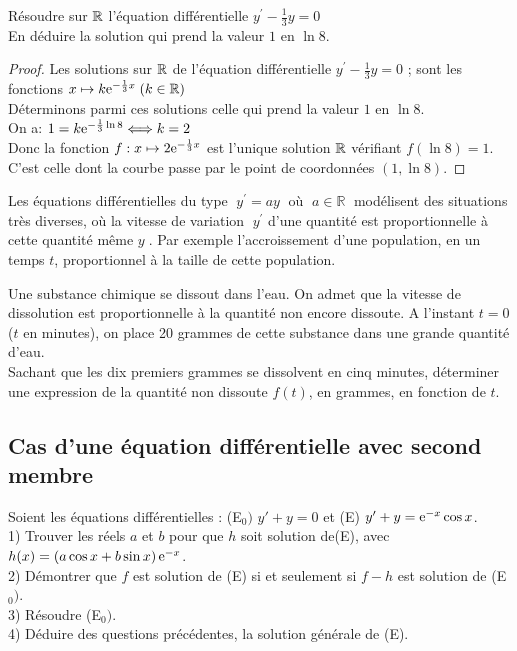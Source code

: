 \begin{exercice}
Résoudre sur $ \mathbb{R} $ l'équation  différentielle \; $ y^{\prime}-\frac{1}{3}y=0 $\\ 
En déduire la solution qui prend la valeur $1 $ en $ \ln 8$.

\end{exercice}
\begin{proof}
Les solutions sur $ \mathbb{R} $ de l'équation  différentielle \; $ y^{\prime}-\frac{1}{3}y=0 $\; ; \; sont les fonctions  $ x\mapsto k\mathrm{e}^{-\frac{1}{3}x}\; (k\in\mathbb{R}) $\\
Déterminons parmi ces solutions celle qui prend la valeur $1 $ en $ \ln 8$.\\ On a:\; $ 1=k\mathrm{e}^{-\frac{1}{3}\ln 8} \Longleftrightarrow k=2$\\
Donc la fonction \;$f:  x\mapsto 2\mathrm{e}^{-\frac{1}{3}x} $  est l'unique solution $ \mathbb{R} $  vérifiant \;$ f(\ln 8)=1 $. C'est celle  dont la courbe passe par le point de coordonnées \;$ (1, \ln 8) $.
\end{proof}
\begin{remark}
Les équations différentielles du type $\;  y^{\prime}=ay \; $ où  $\;  a\in\mathbb{R}\;  $  modélisent des situations très diverses, où la vitesse  de variation $\;   y^{\prime} $ d'une quantité est proportionnelle à cette quantité même $ y \; $. Par exemple l'accroissement d'une population, en un temps $ t $, proportionnel à  la taille de cette population.
\end{remark}
\begin{exercice}
Une substance chimique se dissout dans l'eau. On admet que la vitesse de dissolution est
proportionnelle à la quantité non encore dissoute. A l'instant $t=0$ ($t$ en minutes), on place 20 grammes
de cette substance dans une grande quantité d'eau.\\
Sachant que les dix premiers grammes se dissolvent en cinq minutes, déterminer une expression de la
quantité non dissoute $f(t)$, en grammes, en fonction de $t$.
\end{exercice}
\subsection*{Cas d'une équation différentielle avec second membre}
\begin{exercice}
  Soient les équations différentielles :\; (E$_{0})$ \;$  y'+y=0 $\; et \; (E) \;$  y'+y=\mathrm{e}^{-x}\cos x $.\\
1)  Trouver les réels $ a$ et $b $ pour que $ h $  soit solution de(E), avec $ h(x)=\left(a\cos x+b\sin x\right)\mathrm{e}^{-x} $.\\
2) Démontrer  que   $ f $  est solution de (E)   si et seulement si  $ f-h $  est solution de  (E$_{0})$.\\
3) Résoudre (E$_{0})$.\\
4) Déduire des questions précédentes, la solution générale de (E).
\end{exercice}

